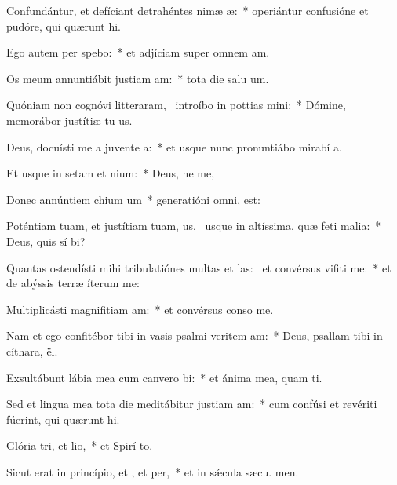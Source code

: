 \item Confundántur, et defíciant detrahéntes nimæ æ:~* operiántur confusióne et pudóre, qui quærunt  hi.
\item Ego autem per spebo:~* et adjíciam super omnem  am.
\item Os meum annuntiábit justiam am:~* tota die salu um.
\item Quóniam non cognóvi litteraram,~\pscross{} introíbo in pottias mini:~* Dómine, memorábor justítiæ tu us.
\item Deus, docuísti me a juvente a:~* et usque nunc pronuntiábo mirabí a.
\item Et usque in setam et nium:~* Deus, ne  me,
\item Donec annúntiem chium um~* generatióni omni,   est:
\item Poténtiam tuam, et justítiam tuam, us,~\pscross{} usque in altíssima, quæ feti malia:~* Deus, quis sí bi?
\item Quantas ostendísti mihi tribulatiónes multas et las:~\pscross{} et convérsus vifiti me:~* et de abýssis terræ íterum  me:
\item Multiplicásti magnifitiam am:~* et convérsus conso  me.
\item Nam et ego confitébor tibi in vasis psalmi veritem am:~* Deus, psallam tibi in cíthara,  ël.
\item Exsultábunt lábia mea cum canvero bi:~* et ánima mea, quam ti.
\item Sed et lingua mea tota die meditábitur justiam am:~* cum confúsi et revériti fúerint, qui quærunt  hi.
\item Glória tri, et lio,~* et Spirí to.
\item Sicut erat in princípio, et , et per,~* et in sǽcula sæcu. men.
